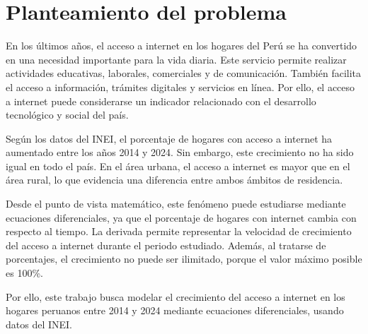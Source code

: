 \section{Planteamiento del problema}

En los últimos años, el acceso a internet en los hogares del Perú se ha convertido en una necesidad importante para la vida diaria. Este servicio permite realizar actividades educativas, laborales, comerciales y de comunicación. También facilita el acceso a información, trámites digitales y servicios en línea. Por ello, el acceso a internet puede considerarse un indicador relacionado con el desarrollo tecnológico y social del país.

Según los datos del INEI, el porcentaje de hogares con acceso a internet ha aumentado entre los años 2014 y 2024. Sin embargo, este crecimiento no ha sido igual en todo el país. En el área urbana, el acceso a internet es mayor que en el área rural, lo que evidencia una diferencia entre ambos ámbitos de residencia.

Desde el punto de vista matemático, este fenómeno puede estudiarse mediante ecuaciones diferenciales, ya que el porcentaje de hogares con internet cambia con respecto al tiempo. La derivada permite representar la velocidad de crecimiento del acceso a internet durante el periodo estudiado. Además, al tratarse de porcentajes, el crecimiento no puede ser ilimitado, porque el valor máximo posible es 100\%.

Por ello, este trabajo busca modelar el crecimiento del acceso a internet en los hogares peruanos entre 2014 y 2024 mediante ecuaciones diferenciales, usando datos del INEI.
